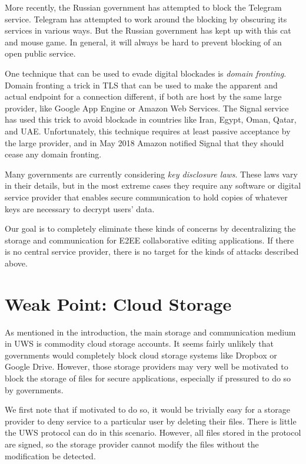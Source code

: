 \documentclass{sig-alternate-hotpets}
\begin{document}
More recently, the Russian government has attempted to block the Telegram service.
Telegram has attempted to work around the blocking by obscuring its services in various ways.
But the Russian government has kept up with this cat and mouse game.
In general, it will always be hard to prevent blocking of an open public service.

One technique that can be used to evade digital blockades is \emph{domain fronting}.
Domain fronting a trick in TLS that can be used to make the apparent and actual endpoint for a connection different, if both are host by the same large provider, like Google App Engine or Amazon Web Services.
The Signal service has used this trick to avoid blockade in countries like Iran, Egypt, Oman, Qatar, and UAE.
Unfortunately, this technique requires at least passive acceptance by the large provider, and in May 2018 Amazon notified Signal that they should cease any domain fronting.

Many governments are currently considering \emph{key disclosure laws}.
These laws vary in their details, but in the most extreme cases they require any software or digital service provider that enables secure communication to hold copies of whatever keys are necessary to decrypt users' data.

Our goal is to completely eliminate these kinds of concerns by decentralizing the storage and communication for E2EE collaborative editing applications.
If there is no central service provider, there is no target for the kinds of attacks described above.

\section{Weak Point: Cloud Storage}

As mentioned in the introduction, the main storage and communication medium in UWS is commodity cloud storage accounts.
It seems fairly unlikely that governments would completely block cloud storage systems like Dropbox or Google Drive.
However, those storage providers may very well be motivated to block the storage of files for secure applications, especially if pressured to do so by governments.

We first note that if motivated to do so, it would be trivially easy for a storage provider to deny service to a particular user by deleting their files.
There is little the UWS protocol can do in this scenario.
However, all files stored in the protocol are signed, so the storage provider cannot modify the files without the modification be detected.
\end{document}
